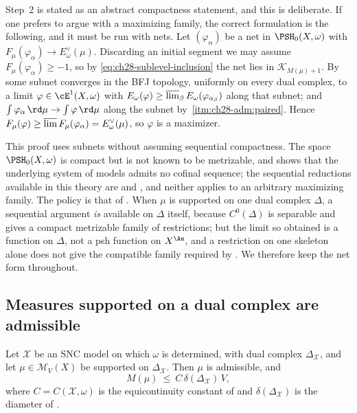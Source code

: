 \begin{remark}
\label{rem:ch28-net-form}
Step~2 is stated as an abstract compactness statement, and this is
deliberate.  If one prefers to argue with a maximizing family, the correct
formulation is the following, and it must be run with nets.  Let
$(\varphi_\alpha)$ be a net in $\PSH_0(X,\omega)$ with
$F_\mu(\varphi_\alpha)\to E^\vee_\omega(\mu)$.  Discarding an initial
segment we may assume $F_\mu(\varphi_\alpha)\geq-1$, so by
\eqref{eq:ch28-sublevel-inclusion} the net lies in
$\mathcal K_{M(\mu)+1}$.  By  some subnet
converges in the BFJ topology, uniformly on every dual complex, to a limit
$\varphi\in\cE^1(X,\omega)$ with
$E_\omega(\varphi)\geq
\varlimsup_\beta E_\omega(\varphi_{\alpha_\beta})$ along that subnet; and
$\int\varphi_\alpha\,\rd\mu\to\int\varphi\,\rd\mu$ along the subnet by
\,\cref{itm:ch28-adm:paired}.  Hence
$F_\mu(\varphi)\geq\varlimsup F_\mu(\varphi_\alpha)=E^\vee_\omega(\mu)$,
so $\varphi$ is a maximizer.

This proof uses subnets without assuming sequential compactness.
The space $\PSH_0(X,\omega)$ is
compact but is not known to be metrizable, and
 shows that the underlying system of
models admits no cofinal sequence; the sequential reductions available in
this theory are  and
, and neither applies to an arbitrary
maximizing family.  The policy is that of
.  When $\mu$ is supported on one
dual complex $\Delta$, a sequential argument \emph{is} available on
$\Delta$ itself, because $C^0(\Delta)$ is separable and
 gives a compact metrizable family of
restrictions; but the limit so obtained is a function on $\Delta$, not a
psh function on $X^{\An}$, and a restriction on one skeleton alone does not give the compatible
family required by .  We therefore keep the net form
throughout.
\end{remark}

\subsection{Measures supported on a dual complex are admissible}
\label{sec:ch28-skeleton-admissible}

\begin{lemma}
\label{lem:ch28-skeleton-admissible}
Let $\mathcal X$ be an SNC model on which $\omega$ is determined, with
dual complex $\Delta_{\mathcal X}$, and let $\mu\in\mathcal M_V(X)$ be
supported on $\Delta_{\mathcal X}$.  Then $\mu$ is admissible, and
\begin{equation}
\label{eq:ch28-skeleton-M-bound}
 M(\mu)\ \leq\ C\,\delta(\Delta_{\mathcal X})\,V ,
\end{equation}
where $C=C(\mathcal X,\omega)$ is the equicontinuity constant of
 and
$\delta(\Delta_{\mathcal X})$ is the diameter of
.
\end{lemma}

